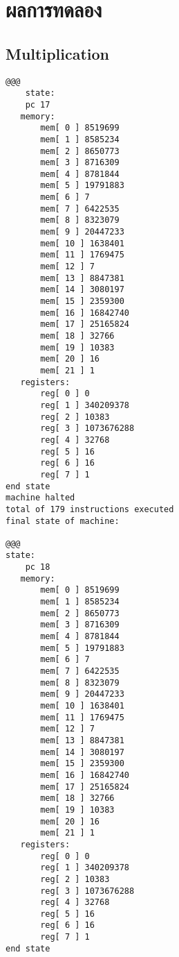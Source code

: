 \documentclass[14pt]{article}
\begin{document}
\newpage
\section{ผลการทดลอง}
\subsection{Multiplication}
\begin{lstlisting}[style=assembly]
@@@
    state:
    pc 17
   memory:
       mem[ 0 ] 8519699
       mem[ 1 ] 8585234
       mem[ 2 ] 8650773
       mem[ 3 ] 8716309
       mem[ 4 ] 8781844
       mem[ 5 ] 19791883
       mem[ 6 ] 7
       mem[ 7 ] 6422535
       mem[ 8 ] 8323079
       mem[ 9 ] 20447233
       mem[ 10 ] 1638401
       mem[ 11 ] 1769475
       mem[ 12 ] 7
       mem[ 13 ] 8847381
       mem[ 14 ] 3080197
       mem[ 15 ] 2359300
       mem[ 16 ] 16842740
       mem[ 17 ] 25165824
       mem[ 18 ] 32766
       mem[ 19 ] 10383
       mem[ 20 ] 16
       mem[ 21 ] 1
   registers:
       reg[ 0 ] 0
       reg[ 1 ] 340209378
       reg[ 2 ] 10383
       reg[ 3 ] 1073676288
       reg[ 4 ] 32768
       reg[ 5 ] 16
       reg[ 6 ] 16
       reg[ 7 ] 1
end state
machine halted
total of 179 instructions executed
final state of machine:

@@@
state:
    pc 18
   memory:
       mem[ 0 ] 8519699
       mem[ 1 ] 8585234
       mem[ 2 ] 8650773
       mem[ 3 ] 8716309
       mem[ 4 ] 8781844
       mem[ 5 ] 19791883
       mem[ 6 ] 7
       mem[ 7 ] 6422535
       mem[ 8 ] 8323079
       mem[ 9 ] 20447233
       mem[ 10 ] 1638401
       mem[ 11 ] 1769475
       mem[ 12 ] 7
       mem[ 13 ] 8847381
       mem[ 14 ] 3080197
       mem[ 15 ] 2359300
       mem[ 16 ] 16842740
       mem[ 17 ] 25165824
       mem[ 18 ] 32766
       mem[ 19 ] 10383
       mem[ 20 ] 16
       mem[ 21 ] 1
   registers:
       reg[ 0 ] 0
       reg[ 1 ] 340209378
       reg[ 2 ] 10383
       reg[ 3 ] 1073676288
       reg[ 4 ] 32768
       reg[ 5 ] 16
       reg[ 6 ] 16
       reg[ 7 ] 1
end state
\end{lstlisting}
\end{document}
